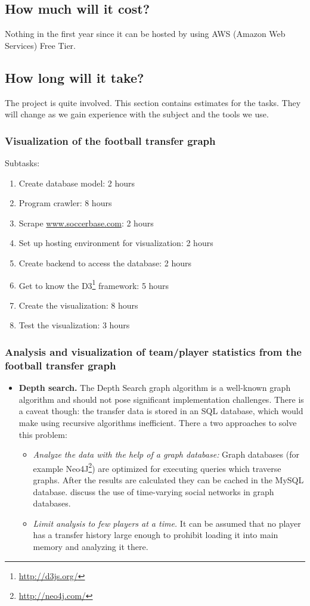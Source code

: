 \documentclass{article}
\begin{document}
\subsection{How much will it cost?}
Nothing in the first year since it can be hosted by using AWS (Amazon Web Services) Free Tier.

\subsection{How long will it take?}
The project is quite involved. This section contains estimates for the tasks. They will change as we gain experience with the subject and the tools we use.

\subsubsection{Visualization of the football transfer graph}
Subtasks:
\begin{enumerate}
\item Create database model: 2 hours
\item Program crawler: 8 hours
\item Scrape \url{www.soccerbase.com}: 2 hours
\item Set up hosting environment for visualization: 2 hours
\item Create backend to access the database: 2 hours
\item Get to know the D3\footnote{\url{http://d3js.org/}} framework: 5 hours
\item Create the visualization: 8 hours
\item Test the visualization: 3 hours
\end{enumerate}

\subsubsection{Analysis and visualization of team/player statistics from the football transfer graph}
\begin{itemize}
\item \textbf{Depth search.} The Depth Search graph algorithm is a well-known graph algorithm and should not pose significant implementation challenges. There is a caveat though: the transfer data is stored in an SQL database, which would make using recursive algorithms inefficient. There a two approaches to solve this problem:
	\begin{itemize}
	\item \textit{Analyze the data with the help of a graph database:} Graph databases (for example Neo4J\footnote{\url{http://neo4j.com/}}) are optimized for executing queries which traverse graphs. After the results are calculated they can be cached in the MySQL database. \cite{Cattuto:2013:TSN:2484425.2484442} discuss the use of time-varying social networks in graph databases.
	\item \textit{Limit analysis to few players at a time.} It can be assumed that no player has a transfer history large enough to prohibit loading it into main memory and analyzing it there.
	\end{itemize}
\end{itemize}
\end{document}
